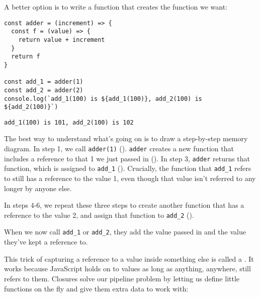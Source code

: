 A better option is to write a function that creates the function we want:

\begin{verbatim}
const adder = (increment) => {
  const f = (value) => {
    return value + increment
  }
  return f
}

const add_1 = adder(1)
const add_2 = adder(2)
console.log(`add_1(100) is ${add_1(100)}, add_2(100) is ${add_2(100)}`)
\end{verbatim}

\begin{verbatim}
add_1(100) is 101, add_2(100) is 102
\end{verbatim}

The best way to understand what's going on is to draw a step-by-step memory diagram.
In step 1, we call \texttt{adder(1)}
().
\texttt{adder} creates a new function that includes a reference to that 1 we just passed in
().
In step 3,
\texttt{adder} returns that function, which is assigned to \texttt{add\_1}
().
Crucially,
the function that \texttt{add\_1} refers to still has a reference to the value 1,
even though that value isn't referred to any longer by anyone else.




In steps 4-6,
we repeat these three steps to create another function that has a reference to the value 2,
and assign that function to \texttt{add\_2}
().


When we now call \texttt{add\_1} or \texttt{add\_2},
they add the value passed in and the value they've kept a reference to.

This trick of capturing a reference to a value inside something else
is called a .
It works because JavaScript holds on to values as long as anything,
anywhere,
still refers to them.
Closures solve our pipeline problem by letting us define little functions
on the fly
and give them extra data to work with:

